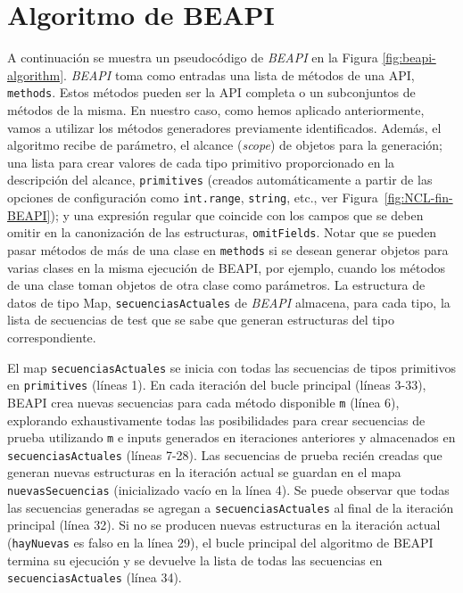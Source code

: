 \section{Algoritmo de BEAPI}
\label{sec:beapiTechnique}

A continuación se muestra un pseudocódigo de \emph{BEAPI} en la Figura \ref{fig:beapi-algorithm}. 
\emph{BEAPI} toma como entradas una lista de métodos de una API,  \texttt{methods}. 
Estos métodos pueden ser la API completa o un subconjuntos de métodos de la misma. 
En nuestro caso, como hemos aplicado anteriormente, vamos a utilizar los métodos generadores previamente identificados. 
Además, el algoritmo recibe de parámetro, el alcance (\emph{scope}) de objetos para la generación; una lista para crear valores de cada tipo primitivo proporcionado en la descripción del alcance,
\texttt{primitives} (creados automáticamente a partir de las opciones de configuración como \texttt{int.range}, \texttt{string}, etc., ver Figura~\ref{fig:NCL-fin-BEAPI}); 
y una expresión regular que coincide con los campos que se deben omitir en la canonización de las estructuras, \texttt{omitFields}. 
Notar que se pueden pasar métodos de más de una clase en \texttt{methods} si se desean generar objetos para varias clases en la misma ejecución de \textsf{BEAPI},
por ejemplo, cuando los métodos de una clase toman objetos de otra clase como parámetros. 
La estructura de datos de tipo Map, \texttt{secuenciasActuales} de \emph{BEAPI}  almacena, para cada tipo, 
la lista de secuencias de test que se sabe que generan estructuras del tipo correspondiente. 

El map \texttt{secuenciasActuales} se inicia con todas las secuencias de tipos primitivos en \texttt{primitives} (líneas 1). 
En cada iteración del bucle principal (líneas 3-33), \textsf{BEAPI}  crea nuevas secuencias para cada método disponible \texttt{m} (línea 6), 
explorando exhaustivamente todas las posibilidades para crear secuencias de prueba utilizando \texttt{m} e inputs generados en iteraciones anteriores y almacenados en \texttt{secuenciasActuales} (líneas 7-28).
Las secuencias de prueba recién creadas que generan nuevas estructuras en la iteración actual se guardan en el mapa \texttt{nuevasSecuencias} (inicializado vacío en la línea 4). 
Se puede observar que todas las secuencias generadas se agregan a \texttt{secuenciasActuales} al final de la iteración principal (línea 32).
Si no se producen nuevas estructuras en la iteración actual (\texttt{hayNuevas} es falso en la línea 29), el bucle principal del algoritmo de \textsf{BEAPI} termina su ejecución 
y se devuelve la lista de todas las secuencias en \texttt{secuenciasActuales} (línea 34).


